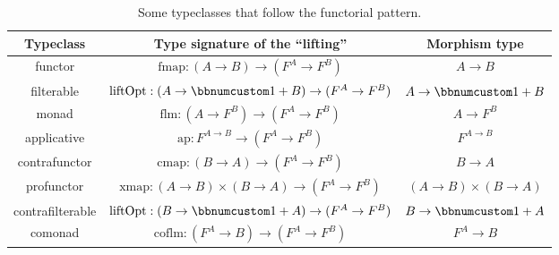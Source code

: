 \begin{table}
\begin{centering}
\begin{tabular}{|c|c|c|}
\hline 
\textbf{\footnotesize{}Typeclass} & \textbf{\footnotesize{}Type signature of the \textsf{``}lifting\textsf{''}} & \textbf{\footnotesize{}Morphism type}\tabularnewline
\hline 
\hline 
{\footnotesize{}functor} & {\footnotesize{}$\text{fmap}:\left(A\rightarrow B\right)\rightarrow(F^{A}\rightarrow F^{B})$} & {\footnotesize{}$A\rightarrow B$}\tabularnewline
\hline 
{\footnotesize{}filterable} & {\footnotesize{}$\text{liftOpt}:\left(A\rightarrow\bbnum 1+B\right)\rightarrow(F^{A}\rightarrow F^{B})$} & {\footnotesize{}$A\rightarrow\bbnum 1+B$}\tabularnewline
\hline 
{\footnotesize{}monad} & {\footnotesize{}$\text{flm}:\left(A\rightarrow F^{B}\right)\rightarrow(F^{A}\rightarrow F^{B})$} & {\footnotesize{}$A\rightarrow F^{B}$}\tabularnewline
\hline 
{\footnotesize{}applicative} & {\footnotesize{}$\text{ap}:F^{A\rightarrow B}\rightarrow(F^{A}\rightarrow F^{B})$} & {\footnotesize{}$F^{A\rightarrow B}$}\tabularnewline
\hline 
{\footnotesize{}contrafunctor} & {\footnotesize{}$\text{cmap}:\left(B\rightarrow A\right)\rightarrow(F^{A}\rightarrow F^{B})$} & {\footnotesize{}$B\rightarrow A$}\tabularnewline
\hline 
{\footnotesize{}profunctor} & {\footnotesize{}$\text{xmap}:\left(A\rightarrow B\right)\times\left(B\rightarrow A\right)\rightarrow(F^{A}\rightarrow F^{B})$} & {\footnotesize{}$\left(A\rightarrow B\right)\times\left(B\rightarrow A\right)$}\tabularnewline
\hline 
{\footnotesize{}contrafilterable} & {\footnotesize{}$\text{liftOpt}:\left(B\rightarrow\bbnum 1+A\right)\rightarrow(F^{A}\rightarrow F^{B})$} & {\footnotesize{}$B\rightarrow\bbnum 1+A$}\tabularnewline
\hline 
{\footnotesize{}comonad} & {\footnotesize{}$\text{coflm}:\left(F^{A}\rightarrow B\right)\rightarrow(F^{A}\rightarrow F^{B})$} & {\footnotesize{}$F^{A}\rightarrow B$}\tabularnewline
\hline 
\end{tabular}
\par\end{centering}
\caption{Some typeclasses that follow the functorial pattern.}
\label{tab:functorial-typeclasses}
\end{table}

